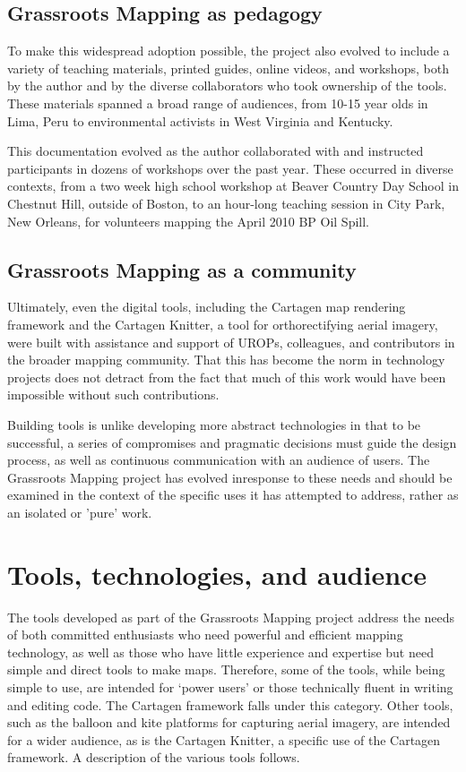 \documentclass[11pt]{report}
\begin{document}
\subsection{Grassroots Mapping as pedagogy}

To make this widespread adoption possible, the project also evolved to include a variety of teaching materials, printed guides, online videos, and workshops, both by the author and by the diverse collaborators who took ownership of the tools. These materials spanned a broad range of audiences, from 10-15 year olds in Lima, Peru to environmental activists in West Virginia and Kentucky. 

This documentation evolved as the author collaborated with and instructed participants in dozens of workshops over the past year. These occurred in diverse contexts, from a two week high school workshop at Beaver Country Day School in Chestnut Hill, outside of Boston, to an hour-long teaching session in City Park, New Orleans, for volunteers mapping the April 2010 BP Oil Spill. 

\subsection{Grassroots Mapping as a community}

Ultimately, even the digital tools, including the Cartagen map rendering framework and the Cartagen Knitter, a tool for orthorectifying aerial imagery, were built with assistance and support of UROPs, colleagues, and contributors in the broader mapping community. That this has become the norm in technology projects does not detract from the fact that much of this work would have been impossible without such contributions. 

Building tools is unlike developing more abstract technologies in that to be successful, a series of compromises and pragmatic decisions must guide the design process, as well as continuous communication with an audience of users. The Grassroots Mapping project has evolved inresponse to these needs and should be examined in the context of the specific uses it has attempted to address, rather as an isolated or 'pure' work.

\section{Tools, technologies, and audience}

The tools developed as part of the Grassroots Mapping project address the needs of both committed enthusiasts who need powerful and efficient mapping technology, as well as those who have little experience and expertise but need simple and direct tools to make maps. Therefore, some of the tools, while being simple to use, are intended for `power users' or those technically fluent in writing and editing code. The Cartagen framework falls under this category. Other tools, such as the balloon and kite platforms for capturing aerial imagery, are intended for a wider audience, as is the Cartagen Knitter, a specific use of the Cartagen framework. A description of the various tools follows.
\end{document}
